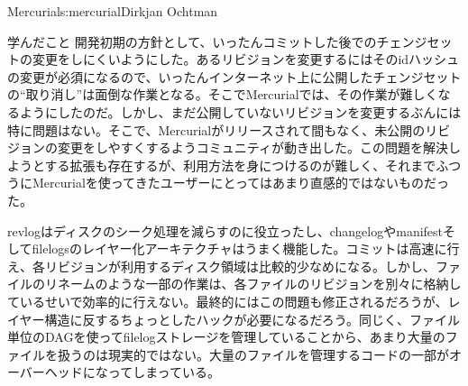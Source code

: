 \begin{aosachapter}{Mercurial}{s:mercurial}{Dirkjan Ochtman}
\begin{aosasect1}{学んだこと}
開発初期の方針として、いったんコミットした後でのチェンジセットの変更をしにくいようにした。あるリビジョンを変更するにはそのidハッシュの変更が必須になるので、いったんインターネット上に公開したチェンジセットの``取り消し''は面倒な作業となる。そこでMercurialでは、その作業が難しくなるようにしたのだ。しかし、まだ公開していないリビジョンを変更するぶんには特に問題はない。そこで、Mercurialがリリースされて間もなく、未公開のリビジョンの変更をしやすくするようコミュニティが動き出した。この問題を解決しようとする拡張も存在するが、利用方法を身につけるのが難しく、それまでふつうにMercurialを使ってきたユーザーにとってはあまり直感的ではないものだった。

revlogはディスクのシーク処理を減らすのに役立ったし、changelogやmanifestそしてfilelogsのレイヤー化アーキテクチャはうまく機能した。コミットは高速に行え、各リビジョンが利用するディスク領域は比較的少なめになる。しかし、ファイルのリネームのような一部の作業は、各ファイルのリビジョンを別々に格納しているせいで効率的に行えない。最終的にはこの問題も修正されるだろうが、レイヤー構造に反するちょっとしたハックが必要になるだろう。同じく、ファイル単位のDAGを使ってfilelogストレージを管理していることから、あまり大量のファイルを扱うのは現実的ではない。大量のファイルを管理するコードの一部がオーバーヘッドになってしまっている。


\end{aosasect1}
\end{aosachapter}
